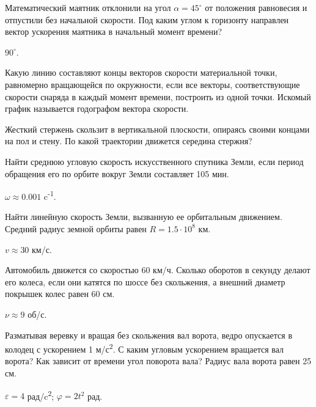 \begin{ex} %
Математический маятник отклонили на угол $\alpha = 45^{\circ}$ от положения равновесия и отпустили без начальной скорости. Под каким углом к горизонту направлен вектор ускорения маятника в начальный момент времени?
\begin{ans}
$90^{\circ}$.
\end{ans}
\end{ex}

\begin{ex}
Какую линию составляют концы векторов скорости материальной точки, равномерно вращающейся по окружности, если все векторы, соответствующие скорости снаряда в каждый момент времени, построить из одной точки. Искомый график называется годографом вектора скорости.
\end{ex}

\begin{ex}
Жесткий стержень скользит в вертикальной плоскости, опираясь своими концами на пол и стену. По какой траектории движется середина стержня?
\end{ex}

\simpleProblems

\begin{ex} %
Найти среднюю угловую скорость искусственного спутника Земли, если период обращения его по орбите вокруг Земли составляет 105 мин.
\begin{ans}
$\omega \approx 0.001$ c\textsuperscript{-1}.
\end{ans}
\end{ex}

\begin{ex} %
Найти линейную скорость Земли, вызванную ее орбитальным движением. Средний радиус земной орбиты равен $R = 1.5 \cdot 10^8$ км.
\begin{ans}
$v \approx 30$ км/с.
\end{ans}
\end{ex}

\begin{ex} %
Автомобиль движется со скоростью 60 км/ч. Сколько оборотов в секунду делают его колеса, если они катятся по шоссе без скольжения, а внешний диаметр покрышек колес равен 60 см.
\begin{ans}
$\nu \approx 9$ об/с.
\end{ans}
\end{ex}

\begin{ex} %
Разматывая веревку и вращая без скольжения вал ворота, ведро опускается в колодец с ускорением 1 м/с\textsuperscript{2}. С каким угловым ускорением вращается вал ворота? Как зависит от времени угол поворота вала? Радиус вала ворота равен 25 см.
\begin{ans}
$\varepsilon = 4$ рад/c\textsuperscript{2}; $\varphi = 2t^2$ рад.
\end{ans}
\end{ex}

